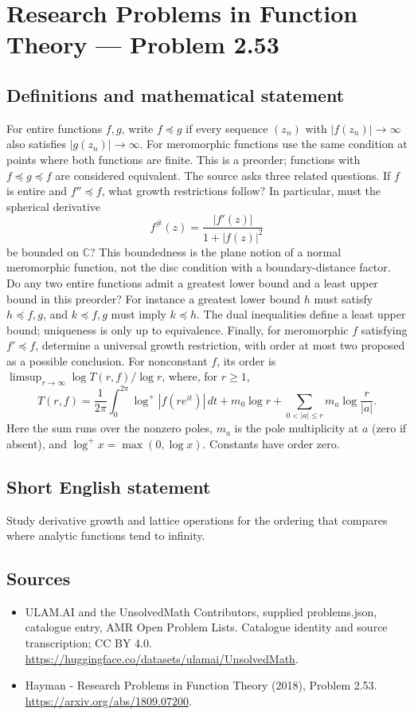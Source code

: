 \documentclass[11pt,a4paper]{article}
\begin{document}
\section*{Research Problems in Function Theory — Problem 2.53}\label{statement}

\subsection{Definitions and mathematical statement}
For entire functions $f,g$, write $f\preceq g$ if every sequence $(z_n)$ with $|f(z_n)|\to\infty$ also satisfies $|g(z_n)|\to\infty$. For meromorphic functions use the same condition at points where both functions are finite. This is a preorder; functions with $f\preceq g\preceq f$ are considered equivalent.
The source asks three related questions. If $f$ is entire and $f''\preceq f$, what growth restrictions follow? In particular, must the spherical derivative
\[
f^{\#}(z)=\frac{|f'(z)|}{1+|f(z)|^2}
\]
be bounded on $\mathbb C$? This boundedness is the plane notion of a normal meromorphic function, not the disc condition with a boundary-distance factor.
Do any two entire functions admit a greatest lower bound and a least upper bound in this preorder? For instance a greatest lower bound $h$ must satisfy $h\preceq f,g$, and $k\preceq f,g$ must imply $k\preceq h$. The dual inequalities define a least upper bound; uniqueness is only up to equivalence.
Finally, for meromorphic $f$ satisfying $f'\preceq f$, determine a universal growth restriction, with order at most two proposed as a possible conclusion. For nonconstant $f$, its order is $\limsup_{r\to\infty}\log T(r,f)/\log r$, where, for $r\ge1$,
\[
T(r,f)=\frac1{2\pi}\int_0^{2\pi}\log^+|f(re^{it})|\,dt
 +m_0\log r+\sum_{0<|a|\le r}m_a\log\frac r{|a|}.
\]
Here the sum runs over the nonzero poles, $m_a$ is the pole multiplicity at $a$ (zero if absent), and $\log^+x=\max(0,\log x)$. Constants have order zero.
\subsection{Short English statement}
Study derivative growth and lattice operations for the ordering that compares where analytic functions tend to infinity.
\subsection{Sources}
\begin{itemize}
\item[S1] ULAM.AI and the UnsolvedMath Contributors, supplied problems.json, catalogue entry, AMR Open Problem Lists. Catalogue identity and source transcription; CC BY 4.0.
\url{https://huggingface.co/datasets/ulamai/UnsolvedMath}.
\item[S2] Hayman - Research Problems in Function Theory (2018), Problem 2.53. 
\url{https://arxiv.org/abs/1809.07200}.
\end{itemize}
\end{document}
